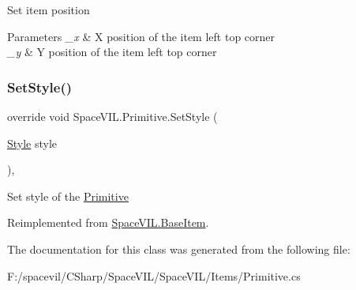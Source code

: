 Set item position 


\begin{DoxyParams}{Parameters}
{\em \+\_\+x} & X position of the item left top corner \\
\hline
{\em \+\_\+y} & Y position of the item left top corner \\
\hline
\end{DoxyParams}
\mbox{\label{class_space_v_i_l_1_1_primitive_ad2a9fbb75eddf7f36af72385a5453fb2}} 
\subsubsection{\texorpdfstring{Set\+Style()}{SetStyle()}}
{\footnotesize\ttfamily override void Space\+V\+I\+L.\+Primitive.\+Set\+Style (\begin{DoxyParamCaption}\item[{\mbox{\hyperlink{class_space_v_i_l_1_1_decorations_1_1_style}{Style}}}]{style }\end{DoxyParamCaption})\hspace{0.3cm}{\ttfamily [inline]}, {\ttfamily [virtual]}}



Set style of the \mbox{\hyperlink{class_space_v_i_l_1_1_primitive}{Primitive}} 



Reimplemented from \mbox{\hyperlink{class_space_v_i_l_1_1_base_item_a74dec9854f0a7553ad3b50f140bfe07d}{Space\+V\+I\+L.\+Base\+Item}}.



The documentation for this class was generated from the following file\+:\begin{DoxyCompactItemize}
\item 
F\+:/spacevil/\+C\+Sharp/\+Space\+V\+I\+L/\+Space\+V\+I\+L/\+Items/Primitive.\+cs\end{DoxyCompactItemize}
